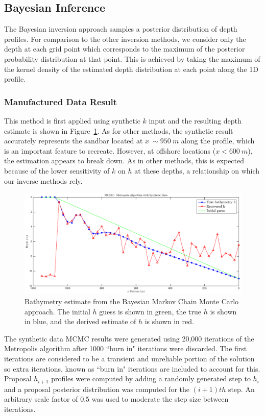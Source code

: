 \subsection{Bayesian Inference} \label{BaysRes}
The Bayesian inversion approach samples a posterior distribution of depth profiles. For comparison to the other inversion methods, we consider only the depth at each grid point which corresponds to the maximum of the posterior probability distribution at that point. This is achieved by taking the maximum of the kernel density of the estimated depth distribution at each point along the 1D profile. 

\subsubsection{Manufactured Data Result}
This method is first applied using synthetic $k$ input and the resulting depth estimate is shown in Figure~\ref{mcmc-synthetic}. As for other methods, the synthetic result accurately represents the sandbar located at $x~\sim950~m$ along the profile, which is an important feature to recreate. However, at offshore locations ($x<600~m$), the estimation appears to break down. As in other methods, this is expected because of the lower sensitivity of $k$ on $h$ at these depths, a relationship on which our inverse methods rely.

\begin{figure}[H]
\center
\includegraphics[scale=0.46]{img/MCMC-manufactured.eps} 
\caption{Bathymetry estimate from the Bayesian Markov Chain Monte Carlo approach. The initial $h$ guess is shown in green, the true $h$ is shown in blue, and the derived estimate of $h$ is shown in red.}
\label{mcmc-synthetic}
\end{figure}

The synthetic data MCMC results were generated using 20,000 iterations of the Metropolis algorithm after 1000 ``burn in" iterations were discarded. The first iterations are considered to be a transient and unreliable portion of the solution so extra iterations, known as ``burn in" iterations are included to account for this. Proposal $h_{i+1}$ profiles were computed by adding a randomly generated step to $h_i$ and a proposal posterior distribution was computed for the $(i+1)th$ step. An arbitrary scale factor of 0.5 was used to moderate the step size between iterations. 


